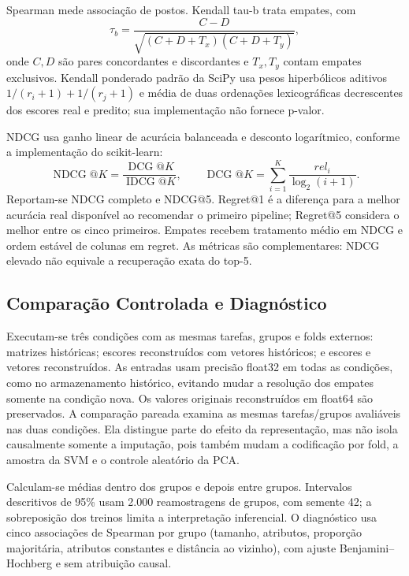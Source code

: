 Spearman mede associação de postos. Kendall tau-b trata empates, com
\begin{equation}\label{eq:kendall}
\tau_b=\frac{C-D}{\sqrt{(C+D+T_x)(C+D+T_y)}},
\end{equation}
onde $C,D$ são pares concordantes e discordantes e $T_x,T_y$ contam empates exclusivos. Kendall ponderado padrão da SciPy usa pesos hiperbólicos aditivos $1/(r_i+1)+1/(r_j+1)$ e média de duas ordenações lexicográficas decrescentes dos escores real e predito; sua implementação não fornece p-valor.

NDCG usa ganho linear de acurácia balanceada e desconto logarítmico, conforme a implementação do scikit-learn:
\begin{equation}\label{eq:ndcg}
\operatorname{NDCG}@K=\frac{\operatorname{DCG}@K}{\operatorname{IDCG}@K},\qquad
\operatorname{DCG}@K=\sum_{i=1}^K\frac{rel_i}{\log_2(i+1)}.
\end{equation}
Reportam-se NDCG completo e NDCG@5. Regret@1 é a diferença para a melhor acurácia real disponível ao recomendar o primeiro pipeline; Regret@5 considera o melhor entre os cinco primeiros. Empates recebem tratamento médio em NDCG e ordem estável de colunas em regret. As métricas são complementares: NDCG elevado não equivale a recuperação exata do top-5.

\subsection{Comparação Controlada e Diagnóstico}

Executam-se três condições com as mesmas tarefas, grupos e folds externos: matrizes históricas; escores reconstruídos com vetores históricos; e escores e vetores reconstruídos. As entradas usam precisão float32 em todas as condições, como no armazenamento histórico, evitando mudar a resolução dos empates somente na condição nova. Os valores originais reconstruídos em float64 são preservados. A comparação pareada examina as mesmas tarefas/grupos avaliáveis nas duas condições. Ela distingue parte do efeito da representação, mas não isola causalmente somente a imputação, pois também mudam a codificação por fold, a amostra da SVM e o controle aleatório da PCA.

Calculam-se médias dentro dos grupos e depois entre grupos. Intervalos descritivos de 95\% usam 2.000 reamostragens de grupos, com semente 42; a sobreposição dos treinos limita a interpretação inferencial. O diagnóstico usa cinco associações de Spearman por grupo (tamanho, atributos, proporção majoritária, atributos constantes e distância ao vizinho), com ajuste Benjamini--Hochberg e sem atribuição causal.

